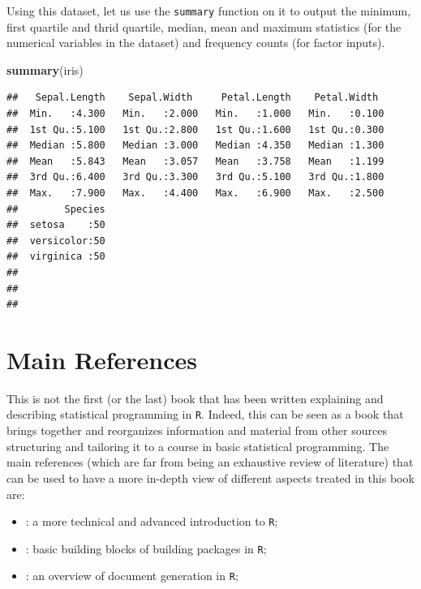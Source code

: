 \documentclass[12pt,]{krantz}
\newenvironment{Shaded}{\begin{snugshade}}{\end{snugshade}}
\newcommand{\KeywordTok}[1]{\textcolor[rgb]{0.27,0.27,0.27}{\textbf{#1}}}
\newcommand{\NormalTok}[1]{#1}
\providecommand{\tightlist}{%
  \setlength{\itemsep}{0pt}\setlength{\parskip}{0pt}}
\begin{document}
Using this dataset, let us use the \texttt{summary} function on it to
output the minimum, first quartile and thrid quartile, median, mean and
maximum statistics (for the numerical variables in the dataset) and
frequency counts (for factor inputs).

\begin{Shaded}
\begin{Highlighting}[]
\KeywordTok{summary}\NormalTok{(iris)}
\end{Highlighting}
\end{Shaded}

\begin{verbatim}
##   Sepal.Length    Sepal.Width     Petal.Length    Petal.Width   
##  Min.   :4.300   Min.   :2.000   Min.   :1.000   Min.   :0.100  
##  1st Qu.:5.100   1st Qu.:2.800   1st Qu.:1.600   1st Qu.:0.300  
##  Median :5.800   Median :3.000   Median :4.350   Median :1.300  
##  Mean   :5.843   Mean   :3.057   Mean   :3.758   Mean   :1.199  
##  3rd Qu.:6.400   3rd Qu.:3.300   3rd Qu.:5.100   3rd Qu.:1.800  
##  Max.   :7.900   Max.   :4.400   Max.   :6.900   Max.   :2.500  
##        Species  
##  setosa    :50  
##  versicolor:50  
##  virginica :50  
##                 
##                 
## 
\end{verbatim}

\section{Main References}\label{main-references}

This is not the first (or the last) book that has been written
explaining and describing statistical programming in \texttt{R}. Indeed,
this can be seen as a book that brings together and reorganizes
information and material from other sources structuring and tailoring it
to a course in basic statistical programming. The main references (which
are far from being an exhaustive review of literature) that can be used
to have a more in-depth view of different aspects treated in this book
are:

\begin{itemize}
\tightlist
\item
  \citet{wickham2014advanced} : a more technical and advanced
  introduction to \texttt{R};
\item
  \citet{wickham2015packages} : basic building blocks of building
  packages in \texttt{R};
\item
  \citet{xie2015} : an overview of document generation in \texttt{R};
\end{itemize}
\end{document}
